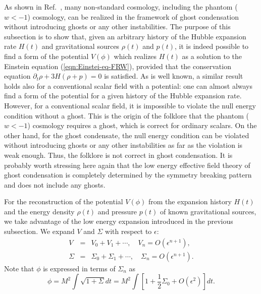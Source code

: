 As shown in Ref.~\cite{Creminelli:2006xe}, many non-standard cosmology, 
including the phantom ($w<-1$) cosmology, can be realized in the
framework of ghost condensation without introducing ghosts or any other
instabilities. The purpose of this subsection is to show that, given an
arbitrary history of the Hubble expansion rate $H(t)$ and gravitational
sources $\rho(t)$ and $p(t)$, it is indeed possible to find a form of
the potential $V(\phi)$ which realizes $H(t)$ as a solution to the
Einstein equation (\ref{eqn:Einstei-eq-FRW}), provided that the
conservation equation $\partial_t\rho+3H(\rho+p)=0$ is satisfied. As is
well known, a similar result holds also for a conventional scalar field
with a potential: one can almost always find a form of the potential for
a given history of the Hubble expansion rate. However, for a
conventional scalar field, it is impossible to violate the null energy
condition without a ghost. This is the origin of the folklore that the
phantom ($w<-1$) cosmology requires a ghost, which is correct for
ordinary scalars. On the other hand, for the ghost condensate, the null
energy condition can be violated without introducing ghosts or any other
instabilities as far as the violation is weak enough. Thus, the folklore
is not correct in ghost condensation. It is probably worth stressing
here again that the low energy effective field theory of ghost
condensation is completely determined by the symmetry breaking pattern
and does not include any ghosts. 



For the reconstruction of the potential $V(\phi)$ from the expansion
history $H(t)$ and the energy density $\rho(t)$ and pressure $p(t)$ of
known gravitational sources, we take advantage of the low energy
expansion introduced in the previous subsection. We expand $V$ and
$\Sigma$ with respect to $\epsilon$: 
%
\begin{eqnarray}
 V & = & V_0 + V_1 + \cdots, \quad 
  V_n = O(\epsilon^{n+1}), \nonumber\\
 \Sigma & = & \Sigma_0 + \Sigma_1 + \cdots, \quad
  \Sigma_n = O(\epsilon^{n+1}). 
\end{eqnarray}
Note that $\phi$ is expressed in terms of $\Sigma_n$ as
%
\begin{equation}
 \phi = M^2 \int \sqrt{1+\Sigma}dt = 
  M^2
  \int\left[1+\frac{1}{2}\Sigma_0
       +O(\epsilon^2)\right]dt.
  \label{eqn:phi-Sigma}
\end{equation}



